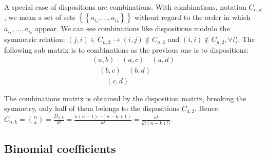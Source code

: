 A special case of dispositions are combinations. With combinations,
notation $C_{n,k}$, we mean a set of sets $\left \lbrace \left \lbrace
    a_{i_1}, \ldots, a_{i_k} \right\rbrace \right\rbrace$ without
regard to the order in which $a_{i_1}, \ldots, a_{i_k}$ appear. We can
see combinations like dispositions modulo the symmetric relation:
$(j,i) \in C_{n,2} \rightarrow (i, j) \not \in C_{n,2}$ and $(i,i)\not
\in C_{n,2}, \forall i$). The following sub matrix is to combinations
as the previous one is to dispositions:
\begin{displaymath}
  \begin{split}
    \left ( a, b \right)\quad
    \left ( a, c \right)\quad
    \left ( a, d \right)\\
    \quad
    \left ( b, c \right)\quad
    \left ( b, d \right)\\
    \quad
    \quad
    \left ( c, d \right)\\
    \quad
    \quad
    \\
  \end{split}
\end{displaymath}
The combinations matrix is obtained by the disposition matrix, breaking
the symmetry, only half of them belongs to the dispositions
$C_{4,2}$. Hence $C_{n,k} = {{n}\choose{k}} = \frac{D_{n,k}}{k!} =
\frac{n(n-1)\cdots(n-k+1)}{k!} = \frac{n!}{k!(n-k)!)} $.

\subsection{Binomial coefficients}

